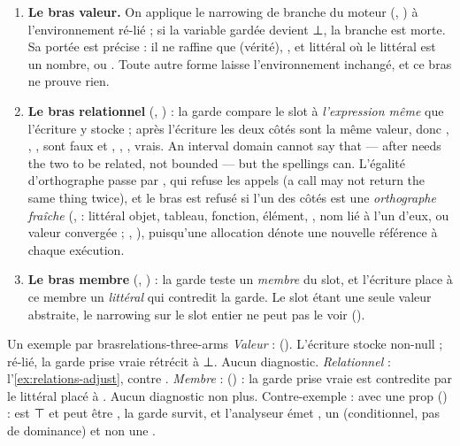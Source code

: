 \begin{enumerate}
  \item \textbf{Le bras valeur.} On applique le narrowing de branche du moteur (, ) à l'environnement ré-lié ; si la variable gardée devient ⊥, la branche est morte. Sa portée est précise : il ne raffine que  (vérité), , et  littéral où le littéral est un nombre,  ou . Toute autre forme laisse l'environnement inchangé, et ce bras ne prouve rien.
  \item \textbf{Le bras relationnel} (, ) : la garde compare le slot à \emph{l'expression même} que l'écriture y stocke ; après l'écriture les deux côtés sont la même valeur, donc \code{<}, \code{>}, \code{!=}, \code{!==} sont faux et \code{==}, \code{===}, \code{<=}, \code{>=} vrais. \og An interval domain cannot say that ---  after  needs the two to be related, not bounded --- but the spellings can.\fg{} L'égalité d'orthographe passe par , qui refuse les appels (\og a call may not return the same thing twice\fg{}), et le bras est refusé si l'un des côtés est une \emph{orthographe fraîche} (,  : littéral objet, tableau, fonction, élément, , nom lié à l'un d'eux, ou valeur convergée  ; , ), puisqu'une allocation dénote une nouvelle référence à chaque exécution.
  \item \textbf{Le bras membre} (, ) : la garde teste un \emph{membre} du slot, et l'écriture place à ce membre un \emph{littéral} qui contredit la garde. Le slot étant une seule valeur abstraite, le narrowing sur le slot entier ne peut pas le voir ().
\end{enumerate}

\begin{exemple}{Un exemple par bras}{relations-three-arms}
\emph{Valeur} :  (). L'écriture stocke  non-null ;  ré-lié, la garde  prise vraie rétrécit  à ⊥. Aucun diagnostic. \emph{Relationnel} : l'\cref{ex:relations-adjust},  contre . \emph{Membre} :  () : la garde  prise vraie est contredite par le littéral  placé à . Aucun diagnostic non plus. Contre-exemple :  avec  une prop () :  est ⊤ et peut être , la garde survit, et l'analyseur émet , un \Warning{} (conditionnel, pas de dominance) et non une \Error.
\end{exemple}


